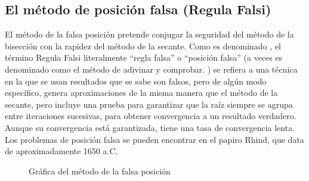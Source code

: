 \subsection{El método de posición falsa (Regula Falsi)}

El método de la falsa posición pretende conjugar la seguridad del método de la bisección con la rapidez del método de la secante.\newline\newline
Como es denominado \cite{Burden_English}, el término Regula Falsi literalmente “regla falsa” o “posición falsa” (a veces es denominado como el método de adivinar y comprobar. \cite{CS_Web}) se refiera a una técnica en la que se usan resultados que se sabe son falsos, pero de algún modo específico, genera aproximaciones de la misma manera que el método de la secante, pero incluye una prueba para garantizar que la raíz siempre se agrupa entre iteraciones sucesivas, para obtener convergencia a un resultado verdadero. Aunque su convergencia está garantizada, tiene una tasa de convergencia lenta.\newline\newline
Los problemas de posición falsa se pueden encontrar en el papiro Rhind, que data de aproximadamente 1650 a.C.

\begin{figure}[!ht]
    \centering
    \caption{Gráfica del método de la falsa posición}
    \label{regula_grap_ej1}
\end{figure}